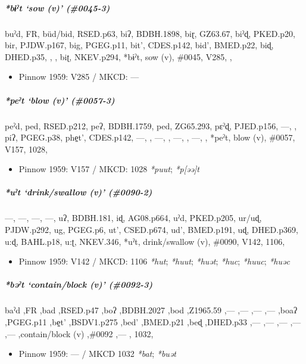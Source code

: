 \documentclass[a4paper,]{article}
\providecommand{\tightlist}{%
  \setlength{\itemsep}{0pt}\setlength{\parskip}{0pt}}
\let\oldsubparagraph\subparagraph
\renewcommand{\subparagraph}[1]{\oldsubparagraph{#1}\mbox{}}
\begin{document}
\subparagraph{\texorpdfstring{\emph{*bɨˀt} `sow (v)'
(\#0045-3)}{*bɨˀt sow (v) (\#0045-3)}}\label{bux268ux2c0t-sow-v-0045-3}

buˀd, FR, büd/bid, RSED.p63, biʔ, BDBH.1898, biɽ, GZ63.67, biˀɖ,
PKED.p20, bir, PJDW.p167, big, PGEG.p11, bit', CDES.p142, bid',
BMED.p22, biɖ, DHED.p35, , , biʈ, NKEV.p294, *bɨˀt, sow (v), \#0045,
V285, ,

\begin{itemize}
\tightlist
\item
  Pinnow 1959: V285 / MKCD: ---
\end{itemize}

\subparagraph{\texorpdfstring{\emph{*peˀt} `blow (v)'
(\#0057-3)}{*peˀt blow (v) (\#0057-3)}}\label{peux2c0t-blow-v-0057-3}

peˀd, ped, RSED.p212, peʔ, BDBH.1759, ped, ZG65.293, pɛˀɖ, PJED.p156,
---, , piʔ, PGEG.p38, phe̠t', CDES.p142, ---, , ---, , ---, , ---, ,
*peˀt, blow (v), \#0057, V157, 1028,

\begin{itemize}
\tightlist
\item
  Pinnow 1959: V157 / MKCD: 1028 \emph{*puut}; \emph{*p{[}əə{]}t}
\end{itemize}

\subparagraph{\texorpdfstring{\emph{*uˀt} `drink/swallow (v)'
(\#0090-2)}{*uˀt drink/swallow (v) (\#0090-2)}}\label{uux2c0t-drinkswallow-v-0090-2}

---, ---, ---, ---, uʔ, BDBH.181, iɖ, AG08.p664, uˀd, PKED.p205, ur/uɖ,
PJDW.p292, ug, PGEG.p6, ut', CSED.p674, ud', BMED.p191, uɖ, DHED.p369,
u:ɖ, BAHL.p18, u:ʈ, NKEV.346, *uˀt, drink/swallow (v), \#0090, V142,
1106,

\begin{itemize}
\tightlist
\item
  Pinnow 1959: V142 / MKCD: 1106 \emph{*hut}; \emph{*huut};
  \emph{*huət}; \emph{*huc}; \emph{*huuc}; \emph{*huəc}
\end{itemize}

\subparagraph{\texorpdfstring{\emph{*bəˀt} `contain/block (v)'
(\#0092-3)}{*bəˀt contain/block (v) (\#0092-3)}}\label{bux259ux2c0t-containblock-v-0092-3}

baˀd ,FR ,bad ,RSED.p47 ,boʔ ,BDBH.2027 ,bod ,Z1965.59 ,--- ,--- ,---
,--- ,boaʔ ,PGEG.p11 ,be̠t' ,BSDV1.p275 ,bed' ,BMED.p21 ,beɖ ,DHED.p33
,--- ,--- ,--- ,--- ,--- ,contain/block (v) ,\#0092 ,--- , 1032,

\begin{itemize}
\tightlist
\item
  Pinnow 1959: --- / MKCD 1032 \emph{*bat}; \emph{*buət}
\end{itemize}
\end{document}
